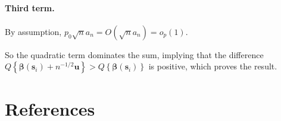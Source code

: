\documentclass[authoryear, review, 11pt]{elsarticle}
\begin{document}
        \paragraph{Third term.} By assumption, $p_0 \sqrt{n} a_n = O(\sqrt{n} a_n) = o_p(1)$.
  
        So the quadratic term dominates the sum, implying that the difference $Q \left\{ \bm{\beta}(\bm{s}_i) + n^{-1/2} \bm{u} \right\} > Q \left\{ \bm{\beta}(\bm{s}_i) \right\}$ is positive, which proves the result.

\section{References}


\end{document}
